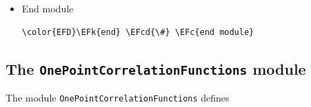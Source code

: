 \documentclass[a4paper]{article}
\numberwithin{equation}{section}
\newcommand{\EFc}[1]{\textcolor{EFc}{#1}} %
\newcommand{\EFcd}[1]{\textcolor{EFcd}{#1}} %
\newcommand{\EFs}[1]{\textcolor{EFs}{#1}} %
\newcommand{\EFk}[1]{\textcolor{EFk}{#1}} %
\newcommand{\EFt}[1]{\textcolor{EFt}{#1}} %
\newcommand{\EFhn}[1]{\textcolor{EFhn}{#1}} %
\begin{document}
\begin{itemize}
\begin{Code}
\begin{Verbatim}
    \EFk{return} res\EFt{/}(\EFhn{2}\EFt{*}Dmn(m, n, B))
\EFk{end}

\textcolor[HTML]{483d8b}{\textbf{@memoize}} \EFk{function} computeCNmn(N, m, n, corr\EFt{::FourPointCorrelation}, channel, lr)
    B = corr.charge[\EFs{"B"}]
    \EFk{if} Rmn\_zero\_order(m, n, corr, channel) \EFt{>} \EFhn{0}
        \EFk{return} \EFhn{0}
    \EFk{elseif} m\EFt{*}n \EFt{>} N
        \EFk{return} \EFhn{0}
    \EFk{elseif} m\EFt{*}n \EFt{==} N
        \EFk{return} Rmn(m, n, corr, channel, lr)
    \EFk{else}
        res = sum(sum(computeCNmn(N\EFt{-}m\EFt{*}n, mp, np, corr, channel, lr)\EFt{/}(δrs(m, \EFt{-}n, B) \EFt{-} δrs(mp, np, B))
                      \EFk{for} mp \EFk{in} \EFhn{1}:N\EFt{-}m\EFt{*}n \EFk{if} mp\EFt{*}np \EFt{<=} N\EFt{-}m\EFt{*}n)
                  \EFk{for} np \EFk{in} \EFhn{1}:N\EFt{-}m\EFt{*}n)
        \EFk{return} Rmn(m, n, corr, channel, lr) \EFt{*} res
    \EFk{end}
\EFk{end}
\end{Verbatim}
\end{Code}
\item End module
\label{sec:orga0bf5bf}

\begin{Code}
\begin{Verbatim}
\color{EFD}\EFk{end} \EFcd{\#} \EFc{end module}
\end{Verbatim}
\end{Code}
\end{itemize}
\subsection{The \texttt{OnePointCorrelationFunctions} module}
\label{sec:org21b4d95}
The module \texttt{OnePointCorrelationFunctions} defines
\end{document}
